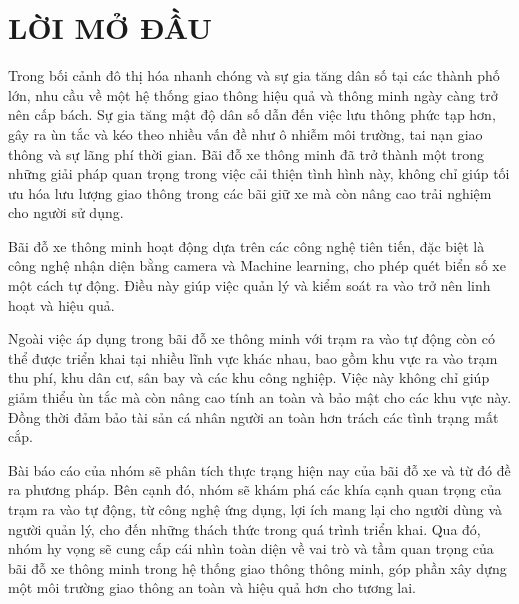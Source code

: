 \chapter*{\centering\Large{LỜI MỞ ĐẦU}}
Trong bối cảnh đô thị hóa nhanh chóng và sự gia tăng dân số tại các thành phố lớn, nhu cầu về một hệ thống giao thông hiệu quả và thông minh ngày càng trở nên cấp bách. Sự gia tăng mật độ dân số dẫn đến việc lưu thông phức tạp hơn, gây ra ùn tắc và kéo theo nhiều vấn đề như ô nhiễm môi trường, tai nạn giao thông và sự lãng phí thời gian. Bãi đỗ xe thông minh đã trở thành một trong những giải pháp quan trọng trong việc cải thiện tình hình này, không chỉ giúp tối ưu hóa lưu lượng giao thông trong các bãi giữ xe mà còn nâng cao trải nghiệm cho người sử dụng.

Bãi đỗ xe thông minh hoạt động dựa trên các công nghệ tiên tiến, đặc biệt là công nghệ nhận diện bằng camera và Machine learning, cho phép quét biển số xe một cách tự động. Điều này giúp việc quản lý và kiểm soát ra vào trở nên linh hoạt và hiệu quả.

Ngoài việc áp dụng trong bãi đỗ xe thông minh với trạm ra vào tự động còn có thể được triển khai tại nhiều lĩnh vực khác nhau, bao gồm khu vực ra vào trạm thu phí, khu dân cư, sân bay và các khu công nghiệp. Việc này không chỉ giúp giảm thiểu ùn tắc mà còn nâng cao tính an toàn và bảo mật cho các khu vực này. Đồng thời đảm bảo tài sản cá nhân người an toàn hơn trách các tình trạng mất cắp.

Bài báo cáo của nhóm sẽ phân tích thực trạng hiện nay của bãi đỗ xe và từ đó đề ra phương pháp. Bên cạnh đó, nhóm sẽ khám phá các khía cạnh quan trọng của trạm ra vào tự động, từ công nghệ ứng dụng, lợi ích mang lại cho người dùng và người quản lý, cho đến những thách thức trong quá trình triển khai. Qua đó, nhóm hy vọng sẽ cung cấp cái nhìn toàn diện về vai trò và tầm quan trọng của bãi đỗ xe thông minh trong hệ thống giao thông thông minh, góp phần xây dựng một môi trường giao thông an toàn và hiệu quả hơn cho tương lai.
